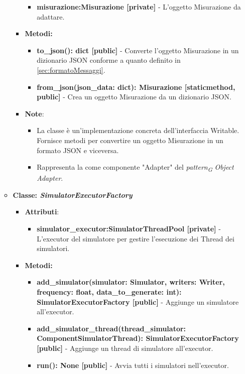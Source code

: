 \begin{itemize}
\begin{itemize}
\begin{itemize}
        \begin{itemize}
        \item \textbf{misurazione:Misurazione [private]} - L'oggetto Misurazione da adattare.
    \end{itemize}
    \item \textbf{Metodi: }
    \begin{itemize}
        \item \textbf{to\_json(): dict [public]} - Converte l'oggetto Misurazione in un dizionario JSON conforme a quanto definito in \ref{sec:formatoMessaggi}.
        \item \textbf{from\_json(json\_data: dict): Misurazione [staticmethod, public]} - Crea un oggetto Misurazione da un dizionario JSON.
    \end{itemize}
    \item\textbf{Note}:
        \begin{itemize}
            \item La classe è un'implementazione concreta dell'interfaccia Writable. Fornisce metodi per convertire un oggetto Misurazione in un formato JSON e viceversa.
            \item Rappresenta la come componente "Adapter" del \textit{pattern}\textsubscript{\textit{G}} \textit{Object Adapter}.
        \end{itemize}
    \end{itemize}
    \item{\textbf{Classe: \textit{SimulatorExecutorFactory}}}
    \begin{itemize}
    \item\textbf{Attributi}:
        \begin{itemize}
        \item \textbf{simulator\_executor:SimulatorThreadPool [private]} - L'executor del simulatore per gestire l'esecuzione dei Thread dei simulatori.
    \end{itemize}
    \item \textbf{Metodi: }
    \begin{itemize}
        \item \textbf{add\_simulator(simulator: Simulator, writers: Writer, frequency: float, data\_to\_generate: int): SimulatorExecutorFactory [public]} - Aggiunge un simulatore all'executor.
        \item \textbf{add\_simulator\_thread(thread\_simulator: ComponentSimulatorThread): SimulatorExecutorFactory [public]} - Aggiunge un thread di simulatore all'executor.
        \item \textbf{run(): None [public]} - Avvia tutti i simulatori nell'executor.

\end{itemize}
\end{itemize}
\end{itemize}
\end{itemize}
